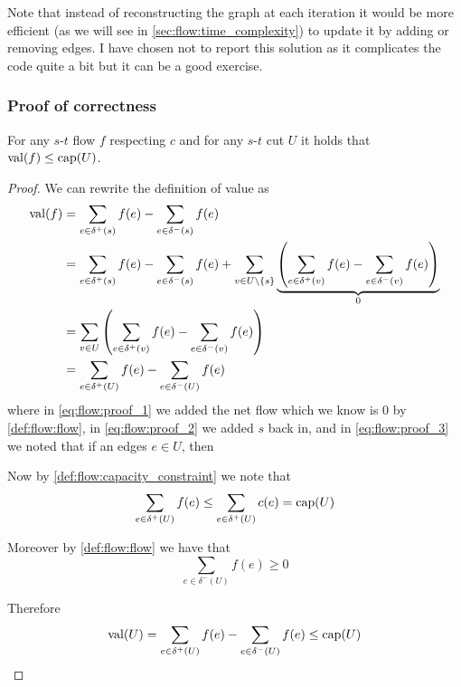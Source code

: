 \documentclass[14pt]{extarticle}
\begin{document}
Note that instead of reconstructing the graph at each iteration it would be more efficient (as we will see in \autoref{sec:flow:time_complexity}) to update it by adding or removing edges.
I have chosen not to report this solution as it complicates the code quite a bit but it can be a good exercise.

\subsubsection{Proof of correctness}

\begin{theorem}
    \label{thm:flow:upper_bound}
    For any $s$-$t$ flow $f$ respecting $c$ and for any $s$-$t$ cut $U$ it holds that ${\operatorfont val}(f) \leq {\operatorfont cap}(U)$.
\end{theorem}

\begin{proof}
    We can rewrite the definition of value as
    \begin{align}
        {\operatorfont val}(f) & = \sum_{e \in \delta^+(s)} f(e) - \sum_{e \in \delta^-(s)} f(e)                                                                                                                                                       \\
                               & = \sum_{e \in \delta^+(s)} f(e) - \sum_{e \in \delta^-(s)} f(e) + \sum_{v \in U \setminus \{s\}} \underbrace{\left( \sum_{e \in \delta^+(v)} f(e) - \sum_{e \in \delta^-(v)} f(e)\right)}_{0} \label{eq:flow:proof_1} \\
                               & = \sum_{v \in U} \left( \sum_{e \in \delta^+(v)} f(e) - \sum_{e \in \delta^-(v)} f(e)\right)  \label{eq:flow:proof_2}                                                                                                 \\
                               & = \sum_{e \in \delta^+(U)} f(e) - \sum_{e \in \delta^-(U)} f(e) \label{eq:flow:proof_3}
    \end{align}
    where in \autoref{eq:flow:proof_1} we added the net flow which we know is $0$ by \autoref{def:flow:flow},
    in \autoref{eq:flow:proof_2} we added $s$ back in,
    and in \autoref{eq:flow:proof_3} we noted that if an edges $e \in U$, then

    Now by \autoref{def:flow:capacity_constraint} we note that
    \begin{equation}
        \sum_{e \in \delta^+(U)} f(e) \leq \sum_{e \in \delta^+(U)} c(e) = {\operatorfont cap}(U)
    \end{equation}

    Moreover by \autoref{def:flow:flow} we have that
    \begin{equation}
        \sum_{e \in \delta^-(U)} f(e) \geq 0
    \end{equation}

    Therefore
    \begin{equation}
        {\operatorfont val}(U) = \sum_{e \in \delta^+(U)} f(e) - \sum_{e \in \delta^-(U)} f(e) \leq {\operatorfont cap}(U)
    \end{equation}
\end{proof}
\end{document}
